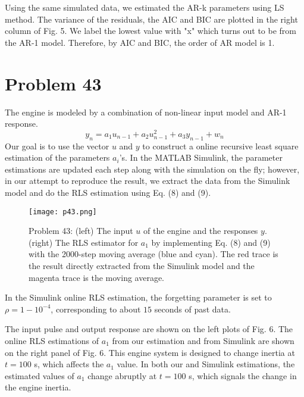 \documentclass[a4paper, 11pt]{article}
\begin{document}
Using the same simulated data, we estimated the AR-k parameters using LS method. The variance of the residuals, the AIC and BIC are plotted in the right column of Fig. 5. We label the lowest value with "x" which turns out to be from the AR-1 model. Therefore, by AIC and BIC, the order of AR model is 1. 



\section*{Problem 43}

The engine is modeled by a combination of non-linear input model and AR-1 response. 
\begin{equation}
y_n = a_1u_{n-1} + a_2u_{n-1}^2 + a_3y_{n-1} + w_n
\end{equation}
Our goal is to use the vector $u$ and $y$ to construct a online recursive least square estimation of the parameters $a_i$'s. In the MATLAB Simulink, the parameter estimations are updated each step along with the simulation on the fly; however, in our attempt to reproduce the result, we extract the data from the Simulink model and do the RLS estimation using Eq. (8) and (9). 

\begin{figure}
	\begin{center}
		\texttt{[image: p43.png]}
		\caption{Problem 43: (left) The input $u$ of the engine and the responses $y$. (right) The RLS estimator for $a_1$ by implementing Eq. (8) and (9) with the 2000-step moving average (blue and cyan). The red trace is the result directly extracted from the Simulink model and the magenta trace is the moving average. }
	\end{center}
\end{figure}

In the Simulink online RLS estimation, the forgetting parameter is set to $\rho=1-10^{-4}$, corresponding to about $15$ seconds of past data. 


The input pulse and output response are shown on the left plots of Fig. 6. The online RLS estimations of $a_1$ from our estimation and from Simulink are shown on the right panel of Fig. 6. This engine system is designed to change inertia at $t=100$ s, which affects the $a_1$ value. In both our and Simulink estimations, the estimated values of $a_1$ change abruptly at $t=100$ s, which signals the change in the engine inertia. 
\end{document}
